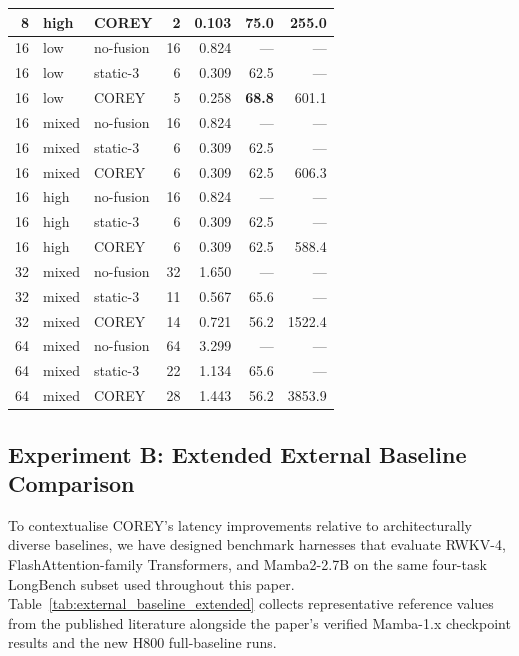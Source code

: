 \begin{table}[h]
{\begin{tabular}{rllrrrr}
 8 & high  & COREY      &  2 & 0.103 & \textbf{75.0}  & 255.0 \\
\midrule
16 & low   & no-fusion  & 16 & 0.824 & ---    & ---  \\
16 & low   & static-3   &  6 & 0.309 & 62.5   & ---  \\
16 & low   & COREY      &  5 & 0.258 & \textbf{68.8}  & 601.1 \\
\midrule
16 & mixed & no-fusion  & 16 & 0.824 & ---    & ---  \\
16 & mixed & static-3   &  6 & 0.309 & 62.5   & ---  \\
16 & mixed & COREY      &  6 & 0.309 & 62.5   & 606.3 \\
\midrule
16 & high  & no-fusion  & 16 & 0.824 & ---    & ---  \\
16 & high  & static-3   &  6 & 0.309 & 62.5   & ---  \\
16 & high  & COREY      &  6 & 0.309 & 62.5   & 588.4 \\
\midrule
32 & mixed & no-fusion  & 32 & 1.650 & ---    & ---  \\
32 & mixed & static-3   & 11 & 0.567 & 65.6   & ---  \\
32 & mixed & COREY      & 14 & 0.721 & 56.2   & 1522.4 \\
\midrule
64 & mixed & no-fusion  & 64 & 3.299 & ---    & ---  \\
64 & mixed & static-3   & 22 & 1.134 & 65.6   & ---  \\
64 & mixed & COREY      & 28 & 1.443 & 56.2   & 3853.9 \\
\bottomrule
\end{tabular}%
}
\end{table}

\subsection{Experiment B: Extended External Baseline Comparison}
\label{sec:exp_external_baselines}

To contextualise COREY's latency improvements relative to architecturally
diverse baselines, we have designed benchmark harnesses that evaluate RWKV-4,
FlashAttention-family Transformers, and Mamba2-2.7B on the same four-task
LongBench subset used throughout this paper.  Table~\ref{tab:external_baseline_extended}
collects representative reference values from the published literature
alongside the paper's verified Mamba-1.x checkpoint results and the new H800
full-baseline runs.

